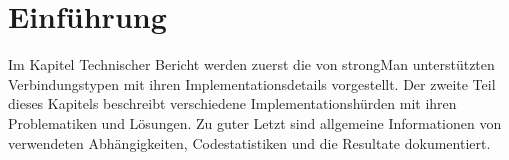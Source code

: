 \section{Einführung}
Im Kapitel Technischer Bericht werden zuerst die von strongMan unterstützten Verbindungstypen mit ihren Implementationsdetails vorgestellt. Der zweite Teil dieses Kapitels beschreibt verschiedene Implementationshürden mit ihren Problematiken und Lösungen. Zu guter Letzt sind allgemeine Informationen von verwendeten Abhängigkeiten, Codestatistiken und die Resultate dokumentiert.